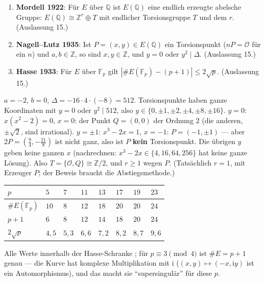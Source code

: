 \begin{merksatz}
\begin{enumerate}[label=(\alph*), leftmargin=1.6em]
\item \textbf{Mordell 1922}: Für $E$ über $\mathbb Q$ ist $E(\mathbb Q)$ eine endlich erzeugte abelsche Gruppe: $E(\mathbb Q)\cong\mathbb Z^{r}\oplus T$ mit endlicher Torsionsgruppe $T$ und dem  $r$. (Auslassung 15.)
\item \textbf{Nagell--Lutz 1935}: Ist $P = (x, y)\in E(\mathbb Q)$ ein Torsionspunkt ($nP = \mathcal O$ für ein $n$) und $a, b\in\mathbb Z$, so sind $x, y\in\mathbb Z$, und $y = 0$ oder $y^{2}\mid\Delta$. (Auslassung 15.)
\item \textbf{Hasse 1933}: Für $E$ über $\mathbb F_p$ gilt $|\#E(\mathbb F_p) - (p + 1)|\le2\sqrt p$. (Auslassung 15.)
\end{enumerate}

$a = -2$, $b = 0$, $\Delta = -16\cdot4\cdot(-8) = 512$. Torsionspunkte haben ganze Koordinaten mit $y = 0$ oder $y^{2}\mid512$, also $y\in\{0, \pm1, \pm2, \pm4, \pm8, \pm16\}$. $y = 0$: $x(x^{2} - 2) = 0$, $x = 0$: der Punkt $Q = (0, 0)$ der Ordnung $2$ (die anderen, $\pm\sqrt2$, sind irrational). $y = \pm1$: $x^{3} - 2x = 1$, $x = -1$: $P = (-1, \pm1)$ --- aber $2P = (\tfrac94, -\tfrac{21}{8})$ ist nicht ganz, also ist $P$ \textbf{kein} Torsionspunkt. Die übrigen $y$ geben keine ganzen $x$ (nachrechnen: $x^{3} - 2x\in\{4, 16, 64, 256\}$ hat keine ganze Lösung). Also $T = \{\mathcal O, Q\}\cong\mathbb Z/2$, und $r\ge1$ wegen $P$. (Tatsächlich $r = 1$, mit Erzeuger $P$; der Beweis braucht die Abstiegsmethode.)

\begin{center}
{\small
\renewcommand{\arraystretch}{1.46}
\begin{tabular}{@{}P{1.6cm}P{0.9cm}P{0.9cm}P{0.9cm}P{0.9cm}P{0.9cm}P{0.9cm}P{0.9cm}@{}}
\toprule
$p$ & $5$ & $7$ & $11$ & $13$ & $17$ & $19$ & $23$\\
\midrule
$\#E(\mathbb F_p)$ & $10$ & $8$ & $12$ & $18$ & $20$ & $20$ & $24$\\
$p + 1$ & $6$ & $8$ & $12$ & $14$ & $18$ & $20$ & $24$\\
$2\sqrt p$ & $4{,}5$ & $5{,}3$ & $6{,}6$ & $7{,}2$ & $8{,}2$ & $8{,}7$ & $9{,}6$\\
\bottomrule
\end{tabular}}
\end{center}
Alle Werte innerhalb der Hasse-Schranke \checkmark; für $p\equiv3\pmod4$ ist $\#E = p + 1$ genau --- die Kurve hat komplexe Multiplikation mit $\mathrm i$ ($(x, y)\mapsto(-x, \mathrm iy)$ ist ein Automorphismus), und das macht sie \enquote{supersingulär} für diese $p$.


\end{merksatz}
